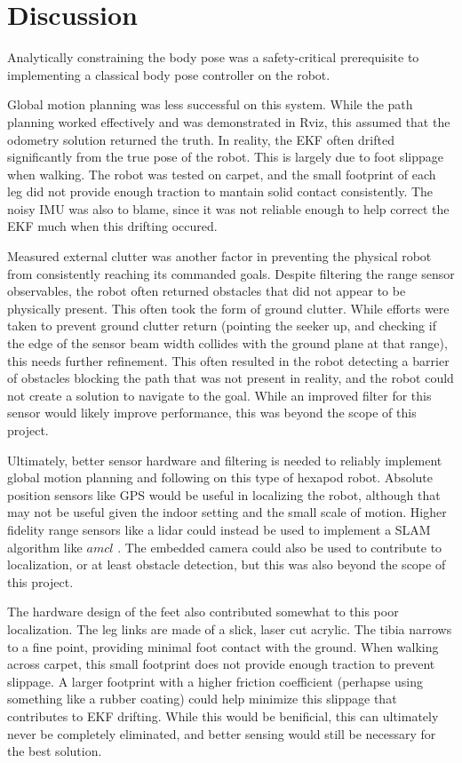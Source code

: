 
\section{ Discussion }

Analytically constraining the body pose was a safety-critical prerequisite to implementing a classical body pose controller on the robot. 

Global motion planning was less successful on this system. While the path planning worked effectively and was demonstrated in Rviz, this assumed that the odometry solution returned the truth. In reality, the EKF often drifted significantly from the true pose of the robot. This is largely due to foot slippage when walking. The robot was tested on carpet, and the small footprint of each leg did not provide enough traction to mantain solid contact consistently. The noisy IMU was also to blame, since it was not reliable enough to help correct the EKF much when this drifting occured. 

Measured external clutter was another factor in preventing the physical robot from consistently reaching its commanded goals. Despite filtering the range sensor observables, the robot often returned obstacles that did not appear to be physically present. This often took the form of ground clutter. While efforts were taken to prevent ground clutter return (pointing the seeker up, and checking if the edge of the sensor beam width collides with the ground plane at that range), this needs further refinement. This often resulted in the robot detecting a barrier of obstacles blocking the path that was not present in reality, and the robot could not create a solution to navigate to the goal. While an improved filter for this sensor would likely improve performance, this was beyond the scope of this project. 

Ultimately, better sensor hardware and filtering is needed to reliably implement global motion planning and following on this type of hexapod robot. Absolute position sensors like GPS would be useful in localizing the robot, although that may not be useful given the indoor setting and the small scale of motion. Higher fidelity range sensors like a lidar could instead be used to implement a SLAM algorithm like $amcl$ \cite{amcl}. The embedded camera could also be used to contribute to localization, or at least obstacle detection, but this was also beyond the scope of this project.

The hardware design of the feet also contributed somewhat to this poor localization. The leg links are made of a slick, laser cut acrylic. The tibia narrows to a fine point, providing minimal foot contact with the ground. When walking across carpet, this small footprint does not provide enough traction to prevent slippage. A larger footprint with a higher friction coefficient (perhapse using something like a rubber coating) could help minimize this slippage that contributes to EKF drifting. While this would be benificial, this can ultimately never be completely eliminated, and better sensing would still be necessary for the best solution.  
